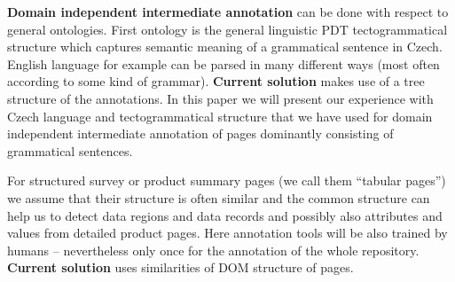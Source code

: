 \documentclass{www2009-submission}
\begin{document}
\textbf{Domain independent intermediate annotation} can be done with respect to general ontologies. First ontology is the general linguistic PDT tectogrammatical structure \cite{biblio:zkraceno_MiBeAnnotationtectogrammatical2006} which captures semantic meaning of a grammatical sentence in Czech. 
English language for example can be parsed in many different ways (most often according to some kind of grammar). {\bf Current solution} makes use of a tree structure of the annotations. In this paper we will present our experience with Czech language and tectogrammatical structure that we have used for domain independent intermediate annotation of pages dominantly consisting of grammatical sentences. 

For structured survey or product summary pages (we call them ``tabular pages'') we assume that their structure is often similar and the common structure can help us to detect data regions and data records and possibly also attributes and values from detailed product pages. Here annotation tools will be also trained by humans -- nevertheless only once for the annotation of the whole repository. {\bf Current solution} uses similarities of DOM structure of pages.






\end{document}

